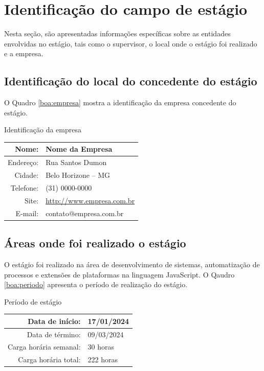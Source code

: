 \documentclass[estagio]{iftex2024}
\begin{document}
\section{Identificação do campo de estágio}

Nesta seção, são apresentadas informações específicas sobre as entidades envolvidas no estágio, tais como o supervisor, o local onde o estágio foi realizado e a empresa.

\subsection{Identificação do local do concedente do estágio}

O Quadro \ref{boa:empresa} mostra a identificação da empresa concedente do estágio.

\begin{board}[!htb] \centering
\caption{Identificação da empresa} \label{boa:empresa}
\begin{varwidth}{\linewidth}
  \begin{tabular}{|r|l|} \hline
  Nome:           & Nome da Empresa                  \\ \hline
  Endereço:       & Rua Santos Dumon                 \\ \hline
  Cidade:         & Belo Horizone -- MG              \\ \hline
  Telefone:       & (31) 0000-0000                   \\ \hline
  Site:           & \url{http://www.empresa.com.br}  \\ \hline
  E-mail:         & contato@empresa.com.br           \\ \hline
  \end{tabular}
\end{varwidth}
\end{board}

\subsection{Áreas onde foi realizado o estágio}

O estágio foi realizado na área de desenvolvimento de sistemas, automatização de processos e extensões de plataformas na linguagem JavaScript.
O Qaudro \ref{boa:periodo} apresenta o período de realização do estágio.

\begin{board}[!htb] \centering
\caption{Período de estágio} \label{boa:periodo}
\begin{varwidth}{\linewidth}
  \begin{tabular}{|r|l|} \hline
  Data de início:        & 17/01/2024 \\ \hline
  Data de término:       & 09/03/2024 \\ \hline
  Carga horária semanal: & 30 horas   \\ \hline
  Carga horária total:   & 222 horas  \\ \hline
  \end{tabular}
\end{varwidth}
\end{board}
\end{document}
